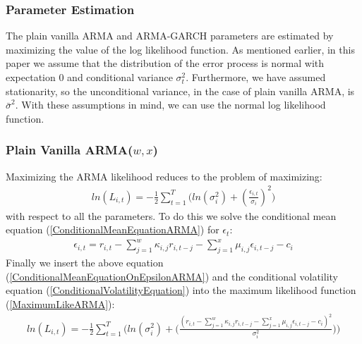 \subsubsection{Parameter Estimation}

The plain vanilla ARMA and ARMA-GARCH parameters are estimated by maximizing the value of the log likelihood function. As mentioned earlier, in this paper we assume that the distribution of the error process is normal with expectation 0 and conditional variance ${\sigma_t^2}$. Furthermore, we have assumed stationarity, so the unconditional variance, in the case of plain vanilla ARMA, is ${\bar\sigma^2}$. With these assumptions in mind, we can use the normal log likelihood function.

\subsubsection{Plain Vanilla ARMA($w,x$)}

Maximizing the ARMA likelihood reduces to the problem of maximizing:
\begin{align} 
    ln(L_{i,t})=-\frac{1}{2}\sum_{t=1}^T\bigg( ln(\sigma_{i}^2)+(\frac{\epsilon_{i,t}}{\sigma_i})^2\bigg)  \label{MaximumLikeARMA}
\end{align}
with respect to all the parameters. To do this we solve the conditional mean equation (\ref{ConditionalMeanEquationARMA}) for $\epsilon_t$:
\begin{align}
     \epsilon_{i,t}=r_{i,t}-\sum_{j=1}^w\kappa_{i,j} r_{i,t-j}-\sum_{j=1}^x\mu_{i,j} \epsilon_{i,t-j}-c_i \label{ConditionalMeanEquationOnEpsilon}
\end{align}
Finally we insert the above equation (\ref{ConditionalMeanEquationOnEpsilonARMA}) and the conditional volatility equation (\ref{ConditionalVolatilityEquation}) into the maximum likelihood function (\ref{MaximumLikeARMA}):
\begin{align} 
    ln(L_{i,t})=-\frac{1}{2}\sum_{t=1}^T\Bigg( ln(\sigma_i^2)+\Big(\frac{(r_{i,t}-\sum_{j=1}^w\kappa_{i,j} r_{i,t-j}-\sum_{j=1}^x\mu_{i,j} \epsilon_{i,t-j}-c_i)^2}{\sigma_i^2}\Big)\Bigg)  \label{fullMaximumLikeARMA}
\end{align}

